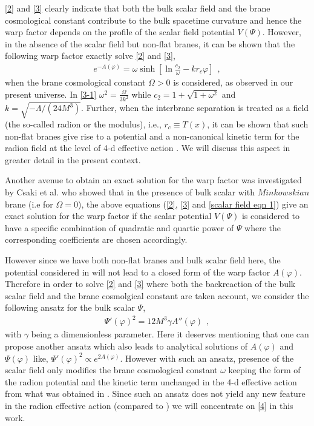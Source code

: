 \documentclass{article}
\begin{document}
\ref{2} and \ref{3} clearly indicate that both the bulk scalar field and the brane cosmological constant 
contribute to the bulk spacetime curvature and hence the warp factor depends on the profile of the scalar field potential $V(\Psi)$. However, in the absence of the scalar field but non-flat branes, it can be shown that the following warp factor exactly solve \ref{2} and \ref{3},
\begin{eqnarray}
 e^{-A(\varphi)} = \omega\sinh\left[\ln{\frac{c_2}{\omega}} - kr_c\varphi\right]~~,
 \label{3-1}
\end{eqnarray}
when the brane cosmological constant $\Omega>0$ is considered, as observed in our present universe. In \ref{3-1} $\omega^2=\frac{\Omega}{3k^2}$ while $c_2 = 1 + \sqrt{1 + \omega^2}$ and $k = \sqrt{-\Lambda/\left(24M^3\right)}$. Further, when the interbrane separation is treated as a field (the so-called radion or the modulus), i.e., $r_c\equiv T(x)$, it can be shown that such non-flat branes give rise to a potential and a non-canonical kinetic term for the radion field at the level of 4-d effective action \cite{Banerjee:2017jyk,Banerjee:2018kcz,Banerjee:2020uil}. We will discuss this aspect in greater detail in the present context.

Another avenue to obtain an exact solution for the warp factor was investigated by Csaki et al.\cite{Csaki:2000zn} who showed that in the presence of bulk scalar with $Minkowskian$ brane (i.e for $\Omega = 0$), the above equations (\ref{2}, \ref{3} and \ref{scalar field eqn 1}) give an exact solution for the warp factor if the scalar potential $V(\Psi)$ is considered to have a specific combination of quadratic and quartic power of $\Psi$ where the corresponding coefficients are chosen accordingly. 


However since we have both non-flat branes and bulk scalar field here, the potential 
considered in \cite{Csaki:2000zn} will not lead to a closed form of the warp factor $A(\varphi)$. Therefore in order to solve \ref{2} and \ref{3} where both the backreaction of 
the bulk scalar field and the brane cosmolgical constant are taken account, we consider the following ansatz for the bulk scalar $\Psi$,
\begin{eqnarray}
\Psi'(\varphi)^2 = 12M^3\gamma A''(\varphi)~~,
\label{4}
\end{eqnarray}
with $\gamma$ being a dimensionless parameter. Here it deserves mentioning that one can propose another ansatz which also leads to analytical solutions of $A(\varphi)$ and $\Psi(\varphi)$ like, $\Psi'(\varphi)^2 \propto e^{2A(\varphi)}$. However with such an ansatz, presence of the scalar field only modifies the brane cosmological constant $\omega$ keeping the form of the radion potential and the kinetic term unchanged in the 4-d effective action from what was obtained in \cite{Banerjee:2017jyk,Banerjee:2018kcz,Banerjee:2020uil}. Since such an ansatz does not yield any new feature in the radion effective action (compared to \cite{Banerjee:2017jyk,Banerjee:2018kcz,Banerjee:2020uil}) we will concentrate on \ref{4} in this work.
\end{document}
